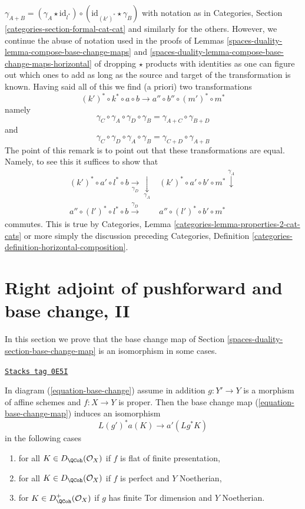 \begin{remark}
$\gamma_{A + B} = (\gamma_A \star \text{id}_{l^*}) \circ
(\text{id}_{(k')^*} \star \gamma_B)$ with notation as in
Categories, Section \ref{categories-section-formal-cat-cat}
and similarly for the others. However, we continue the
abuse of notation used in the proofs of
Lemmas \ref{spaces-duality-lemma-compose-base-change-maps} and
\ref{spaces-duality-lemma-compose-base-change-maps-horizontal}
of dropping $\star$ products with identities as one can figure
out which ones to add as long as the source and target of the
transformation is known.
Having said all of this we find (a priori) two transformations
$$
(k')^* \circ k^* \circ a \circ b
\longrightarrow
a'' \circ b'' \circ (m')^* \circ m^*
$$
namely
$$
\gamma_C \circ \gamma_A \circ \gamma_D \circ \gamma_B =
\gamma_{A + C} \circ \gamma_{B + D}
$$
and
$$
\gamma_C \circ \gamma_D \circ \gamma_A \circ \gamma_B =
\gamma_{C + D} \circ \gamma_{A + B}
$$
The point of this remark is to point out that these transformations
are equal. Namely, to see this it suffices to show that
$$
\begin{array}{cc}(k')^* \circ a' \circ l^* \circ b \underset{\gamma_D}{\longrightarrow}\underset{\gamma_A}{\downarrow} & (k')^* \circ a' \circ b' \circ m^* \overset{\gamma_A}{\downarrow} \\ a'' \circ (l')^* \circ l^* \circ b \overset{\gamma_D}{\longrightarrow} & a'' \circ (l')^* \circ b' \circ m^*\end{array}
$$
commutes. This is true by
Categories, Lemma \ref{categories-lemma-properties-2-cat-cats}
or more simply the discussion preceding
Categories, Definition \ref{categories-definition-horizontal-composition}.
\end{remark}

\section{Right adjoint of pushforward and base change, II}
\label{spaces-duality-section-base-change-II}
In this section we prove that the base change map of
Section \ref{spaces-duality-section-base-change-map} is an isomorphism
in some cases.

\begin{lemma}
\label{spaces-duality-lemma-more-base-change}
\href{https://stacks.math.columbia.edu/tag/0E5I}{\texttt{Stacks tag 0E5I}}

In diagram (\ref{equation-base-change}) assume in addition
$g : Y' \to Y$ is a morphism of affine schemes and $f : X \to Y$ is proper.
Then the base change map (\ref{equation-base-change-map}) induces an
isomorphism
$$
L(g')^*a(K) \longrightarrow a'(Lg^*K)
$$
in the following cases
\begin{enumerate}
\item for all $K \in D_\QCoh(\mathcal{O}_X)$ if $f$
is flat of finite presentation,
\item for all $K \in D_\QCoh(\mathcal{O}_X)$ if $f$
is perfect and $Y$ Noetherian,
\item for $K \in D_\QCoh^+(\mathcal{O}_X)$ if $g$ has finite Tor dimension
and $Y$ Noetherian.
\end{enumerate}
\end{lemma}

